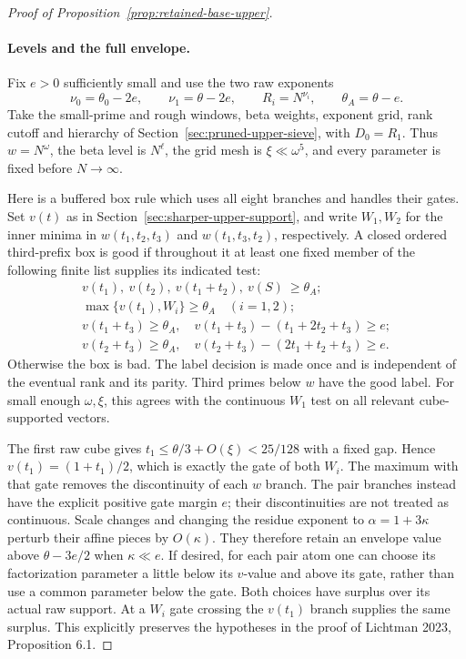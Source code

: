 \documentclass[11pt]{article}
\begin{document}
\begin{proof}[Proof of Proposition~\ref{prop:retained-base-upper}]
\paragraph{Levels and the full envelope.}
Fix $e>0$ sufficiently small and use the two raw exponents
\[
 \nu_0=\theta_0-2e,\qquad \nu_1=\theta-2e,
 \qquad R_i=N^{\nu_i},\qquad \theta_A=\theta-e.
\]
Take the small-prime and rough windows, beta weights, exponent grid,
rank cutoff and hierarchy of Section~\ref{sec:pruned-upper-sieve},
with $D_0=R_1$. Thus $w=N^\omega$, the beta level is $N^\ell$,
the grid mesh is $\xi\ll\omega^5$, and every parameter is fixed
before $N\to\infty$.

Here is a buffered box rule which uses all eight branches and handles
their gates. Set $v(t)$ as in Section~\ref{sec:sharper-upper-support},
and write $W_1,W_2$ for the inner minima in
$w(t_1,t_2,t_3)$ and $w(t_1,t_3,t_2)$, respectively.
A closed ordered third-prefix box is good if throughout it at least
one fixed member of the following finite list supplies its indicated
test:
\[
 \begin{gathered}
 v(t_1),\ v(t_2),\ v(t_1+t_2),\ v(S)\ \ge\theta_A;\\
 \max\{v(t_1),W_i\}\ge\theta_A\quad(i=1,2);\\
 v(t_1+t_3)\ge\theta_A,\quad
 v(t_1+t_3)-(t_1+2t_2+t_3)\ge e;\\
 v(t_2+t_3)\ge\theta_A,\quad
 v(t_2+t_3)-(2t_1+t_2+t_3)\ge e.
 \end{gathered}
\]
Otherwise the box is bad. The label decision is made once and is
independent of the eventual rank and its parity. Third primes below
$w$ have the good label. For small enough $\omega,\xi$, this agrees
with the continuous $W_1$ test on all relevant cube-supported vectors.

The first raw cube gives $t_1\le\theta/3+O(\xi)<25/128$ with a
fixed gap. Hence $v(t_1)=(1+t_1)/2$, which is exactly the gate of
both $W_i$. The maximum with that gate removes the discontinuity
of each $w$ branch. The pair branches instead have the explicit
positive gate margin $e$; their discontinuities are not treated as
continuous. Scale changes and changing the residue exponent to
$\alpha=1+3\kappa$ perturb their affine pieces by $O(\kappa)$.
They therefore retain an envelope value above
$\theta-3e/2$ when $\kappa\ll e$. If desired, for each pair atom
one can choose its factorization parameter a little below its
$v$-value and above its gate, rather than use a common parameter
below the gate. Both choices have surplus over its actual raw
support. At a $W_i$ gate crossing the $v(t_1)$ branch supplies the
same surplus. This explicitly preserves the hypotheses in the proof
of Lichtman 2023, Proposition 6.1.


\end{proof}
\end{document}
